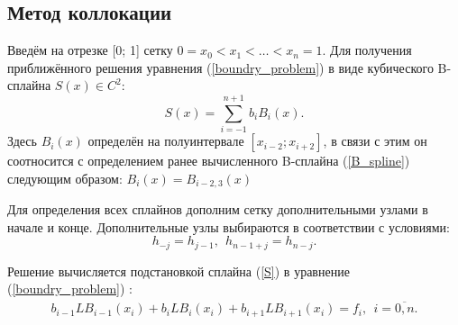 \documentclass[a4paper,14pt]{extarticle}
\begin{document}
    \subsection{Метод коллокации}

    Введём на отрезке [0; 1] сетку $0 = x_0 < x_1 < \ldots < x_n = 1$.
    Для получения приближённого решения уравнения (\ref{boundry_problem}) в виде кубического B-сплайна $S(x) \in C^2$:
    \begin{equation} \label{S} \displaystyle
        S(x) = \sum_{i = -1}^{n + 1} b_i B_i(x).
    \end{equation}
    Здесь $B_i(x)$ определён на полуинтервале $[x_{i - 2}; x_{i + 2}]$, в связи с этим он соотносится с определением ранее вычисленного B-сплайна (\ref{B_spline}) следующим образом:
    $
    B_i(x) = B_{i - 2, 3}(x)
    $

    Для определения всех сплайнов дополним сетку дополнительными узлами в начале и конце.
    Дополнительные узлы выбираются в соответствии с условиями:
    \begin{equation*}
        h_{-j} = h_{j - 1}, ~~ h_{n - 1 + j} = h_{n - j}.
    \end{equation*}

    Решение вычисляется подстановкой сплайна (\ref{S}) в уравнение (\ref{boundry_problem}) \cite{Kolobov}:
    \begin{equation} \label{exaction}
        \begin{gathered}
            b_{i - 1} LB_{i - 1}(x_i) + b_i LB_i(x_i) + b_{i + 1} LB_{i + 1}(x_i) = f_i, ~~ i = \overline{0, n}. \\
        \end{gathered}
    \end{equation}
\end{document}
